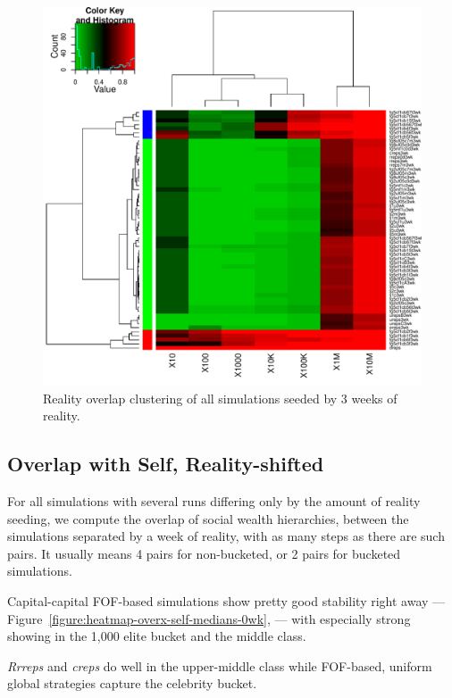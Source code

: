 \documentclass[10pt,oneside]{memoir}
\begin{document}
\begin{Spacing}{2}
\begin{figure}
\begin{center}
    \includegraphics{figures/heatmap-overx-dreps-medians-3wk}
    \caption{Reality overlap clustering of all simulations seeded by 3 weeks of reality.}
    \label{figure:heatmap-overx-dreps-medians-3wk}
\end{center}
\end{figure}
\pagebreak \subsection{Overlap with Self, Reality-shifted}
\label{overlapwithselfreality-shifted}

For all simulations with several runs differing only by the amount of reality seeding, we compute the overlap of social wealth hierarchies, between the simulations separated by a week of reality, with as many steps as there are such pairs.  It usually means 4 pairs for non-bucketed, or 2 pairs for bucketed simulations.


Capital-capital FOF-based simulations show pretty good stability right away --- Figure~\ref{figure:heatmap-overx-self-medians-0wk}, --- with especially strong showing in the 1,000 elite bucket and the middle class.


{\itshape Rrreps} and {\itshape creps} do well in the upper-middle class while FOF-based, uniform global strategies capture the celebrity bucket.



\end{Spacing}
\end{document}

